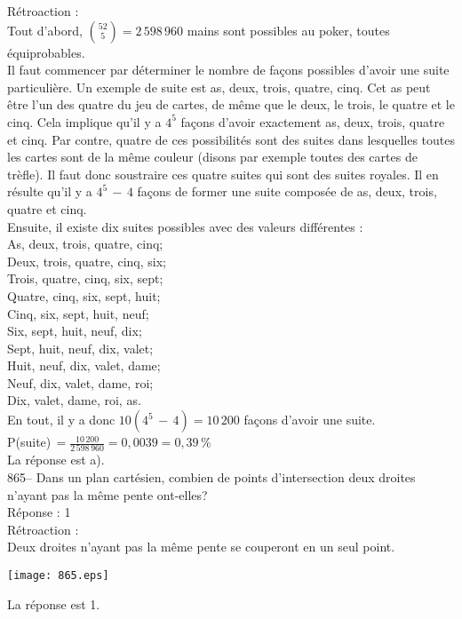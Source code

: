 ﻿\documentclass[letterpaper, 12pt]{article}
\begin{document}
R\'etroaction : \\
Tout d'abord, $\binom{52}{5}=2\,598\,960$ mains sont possibles au poker,
toutes \'equiprobables.  \\
Il faut commencer par d\'eterminer le nombre de fa\c cons possibles d'avoir
une suite particuli\`ere.  Un exemple de suite est as, deux, trois, quatre,
cinq.  Cet as peut \^etre l'un des quatre du jeu de cartes, de m\^eme que le
deux, le trois, le quatre et le cinq.  Cela implique qu'il y a $4^{5}$ fa\c
cons d'avoir exactement as, deux, trois, quatre et cinq.  Par contre, quatre
de ces possibilit\'es sont des suites dans lesquelles toutes les cartes sont
de la m\^eme couleur (disons par exemple toutes des cartes de tr\`efle).  Il
faut donc soustraire ces quatre suites qui sont des suites royales.  Il en
r\'esulte qu'il y a $4^{5}\,-\,4$ fa\c cons de former une suite compos\'ee
de as, deux, trois, quatre et cinq.  \\
Ensuite, il existe dix suites possibles avec des valeurs diff\'erentes :\\
As, deux, trois, quatre, cinq;\\
Deux, trois, quatre, cinq, six;\\
Trois, quatre, cinq, six, sept;\\
Quatre, cinq, six, sept, huit;\\
Cinq, six, sept, huit, neuf;\\
Six, sept, huit, neuf, dix;\\
Sept, huit, neuf, dix, valet;\\
Huit, neuf, dix, valet, dame;\\
Neuf, dix, valet, dame, roi;\\
Dix, valet, dame, roi, as.\\

En tout, il y a donc $10(4^{5}\,-\,4)=10\,200$ fa\c cons d'avoir une suite.
\\[2mm]
P(suite)$\,=\frac{10\,200}{2\,598\,960}=0,0039=0,39\,\%$\\[2mm]
La r\'eponse est a).\\

865-- Dans un plan cart\'esien, combien de points d'intersection deux
droites n'ayant pas la m\^eme pente ont-elles?\\

R\'eponse : 1\\

R\'etroaction : \\
Deux droites n'ayant pas la m\^eme pente se couperont en un seul
point.   \begin{center}
    \texttt{[image: 865.eps]}
    \end{center}  La
r\'eponse est 1.\\
\end{document}
